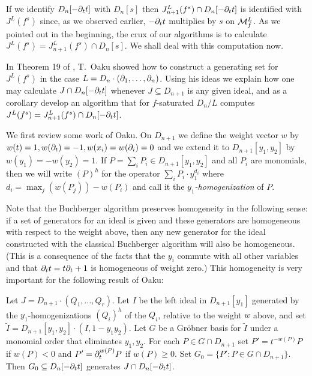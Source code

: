 \bigskip

If we identify $D_n[-\partial_tt]$ with $D_n[s]$ then $J^L_{n+1}(f^s)\cap
D_n[-\partial_tt]$ is identified with  $J^L(f^s)$ since, as we observed
earlier, $-\partial_tt$ multiplies by $s$ on ${\mathcal M}^L_f$. 
As we pointed out in the beginning, the crux of our algorithms is to
calculate $J^L(f^s)=J^L_{n+1}(f^s)\cap D_n[s]$. We shall deal with
this computation now.

In Theorem 19 of \cite{DM:Oa2}, T.~Oaku
showed how to construct a generating set for $J^L(f^s)$ in the case 
$L=D_n\cdot(\partial_1,\ldots,\partial_n)$. 
Using his ideas we explain how one may calculate $J\cap
D_n[-\partial_tt]$ whenever $J\subseteq D_{n+1}$ is any given ideal, and as a
corollary develop an algorithm that for $f$-saturated $D_n/L$
computes $J^L(f^s)=J^L_{n+1}(f^s)\cap D_n[-\partial_tt]$. 

We first review some work
of Oaku. 
On $D_{n+1}$ we define the weight vector
 $w$ by  $w(t)=1,
w(\partial_t)=-1, w(x_i)=w(\partial_i)=0$ and we extend it to
$D_{n+1}[y_1,y_2]$ by $w(y_1)=-w(y_2)=1$. If $P=\sum_i P_i\in
D_{n+1}[y_1,y_2]$ and all $P_i$ are monomials, then we will write
$(P)^h$ for the operator $\sum_i P_i\cdot y_1^{d_i}$ where
$d_i=\max_j(w(P_j))-w(P_i)$ and call it the {\em
$y_1$-homogenization} 
of $P$.

Note that the
Buchberger algorithm preserves homogeneity 
in the following sense: if a set of generators for an ideal is given
and these generators are homogeneous with respect to the weight above,
then any new generator for the ideal constructed with the classical
Buchberger algorithm will also be homogeneous. (This is a consequence
of the facts that the $y_i$ commute with all other variables and that
$\partial_t t=t\partial_t+1$ is homogeneous of weight zero.) 
This homogeneity is very important for the following 
result of Oaku:
\begin{proposition}
Let $J=D_{n+1}\cdot(Q_1,\ldots,Q_r)$.
Let $I$ be the left ideal in $D_{n+1}[y_1]$ generated by the
$y_1$-homogenizations $(Q_i)^h$ of the $Q_i$, relative to the weight
$w$ above, and set $\tilde
I=D_{n+1}[y_1,y_2]\cdot (I,1-y_1y_2)$. Let $G$ be a Gr\"obner basis
for $\tilde I$ under a monomial order that eliminates $y_1,y_2$. For
each $P\in G\cap D_{n+1}$ 
set $P'=t^{-w(P)}P$ if $w(P)<0$ and $P'=\partial_t^{w(P)}P$ if
$w(P)\geq 0$. Set $G_0=\{ P': P\in G\cap D_{n+1}\}$. Then
$G_0\subseteq D_n[-\partial_tt]$ generates $J\cap D_n[-\partial_tt]$.
\end{proposition}

